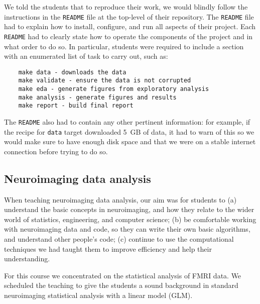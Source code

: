 We told the students that to reproduce their work, we would blindly
follow the instructions in the \texttt{README} file at the top-level
of their repository.
The \texttt{README} file had to explain how to install, configure,
and run all aspects of their project.
Each \texttt{README} had to clearly state how to operate the
components of the project and in what order to do so.
In particular, students were required to include a section with
an enumerated list of task to carry out, such as:
\begin{verbatim}
    make data - downloads the data 
    make validate - ensure the data is not corrupted
    make eda - generate figures from exploratory analysis
    make analysis - generate figures and results
    make report - build final report
\end{verbatim}

The \texttt{README} also had to contain any other pertinent information: for
example, if the recipe for \texttt{data} target downloaded 5~GB of data, it had
to warn of this so we would make sure to have enough disk space and that we were
on a stable internet connection before trying to do so.



\subsection{Neuroimaging data analysis}\label{analysis}

When teaching neuroimaging data analysis, our aim was for students to
(a) understand the basic concepts in neuroimaging,
and how they relate to the wider world of statistics, engineering, and computer science;
(b) be comfortable working with neuroimaging data and code, so they can write
their own basic algorithms, and understand other people's code;
(c) continue to use the computational techniques we had taught them to improve
efficiency and help their understanding.

For this course we concentrated on the statistical analysis of FMRI data.  We
scheduled the teaching to give the students a sound background in standard
neuroimaging statistical analysis with a linear model (GLM).

